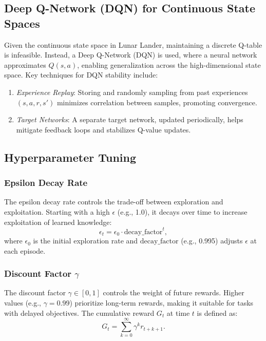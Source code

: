 \documentclass[conference]{IEEEtran}
\begin{document}
\subsection{Deep Q-Network (DQN) for Continuous State Spaces}

Given the continuous state space in Lunar Lander, maintaining a discrete Q-table is infeasible. Instead, a Deep Q-Network (DQN) is used, where a neural network approximates \( Q(s, a) \), enabling generalization across the high-dimensional state space. Key techniques for DQN stability include:

\begin{enumerate}
    \item \textit{Experience Replay}: Storing and randomly sampling from past experiences \((s, a, r, s')\) minimizes correlation between samples, promoting convergence.
    \item \textit{Target Networks}: A separate target network, updated periodically, helps mitigate feedback loops and stabilizes Q-value updates.
\end{enumerate}

\subsection{Hyperparameter Tuning}

\subsubsection{Epsilon Decay Rate}

The epsilon decay rate controls the trade-off between exploration and exploitation. Starting with a high \( \epsilon \) (e.g., 1.0), it decays over time to increase exploitation of learned knowledge:
\begin{equation}
\epsilon_t = \epsilon_0 \cdot \text{decay\_factor}^t,
\end{equation}
where \( \epsilon_0 \) is the initial exploration rate and \( \text{decay\_factor} \) (e.g., 0.995) adjusts \( \epsilon \) at each episode.

\subsubsection{Discount Factor \( \gamma \)}

The discount factor \( \gamma \in [0, 1] \) controls the weight of future rewards. Higher values (e.g., \( \gamma = 0.99 \)) prioritize long-term rewards, making it suitable for tasks with delayed objectives. The cumulative reward \( G_t \) at time \( t \) is defined as:
\begin{equation}
G_t = \sum_{k=0}^{\infty} \gamma^k r_{t+k+1}.
\end{equation}
\end{document}
